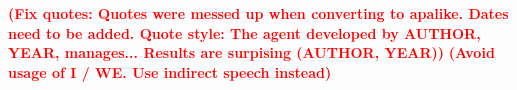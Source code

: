 \documentclass{thesisclass}
\newcommand{\margtodo}
{\marginpar{\textbf{\textcolor{red}{ToDo}}}{}}
\newcommand{\todo}[1]
{{\textbf{\textcolor{red}{(\margtodo{}#1)}}}{}}
\begin{document}

\frontmatter
{}

\setmarginsrb{3cm}{1cm}{3cm}{1cm}{6mm}{7mm}{5mm}{15mm}
\blankpage





\setcounter{tocdepth}{2}
\tableofcontents
\blankpage


\mainmatter
{}


\todo{Fix quotes: Quotes were messed up when converting to apalike. Dates need to be added. Quote style: The agent developed by AUTHOR, YEAR, manages... Results are surpising (AUTHOR, YEAR)}
\todo{Avoid usage of I / WE. Use indirect speech instead}










\cleardoublepage
{}
{}
\listoffigures

\cleardoublepage
{}
{}
\listoftables

\cleardoublepage
{}
{}
\lstlistoflistings




\cleardoublepage
{}
{}

												  

\printbibliography

\cleardoublepage



\cleardoublepage

\end{document}
